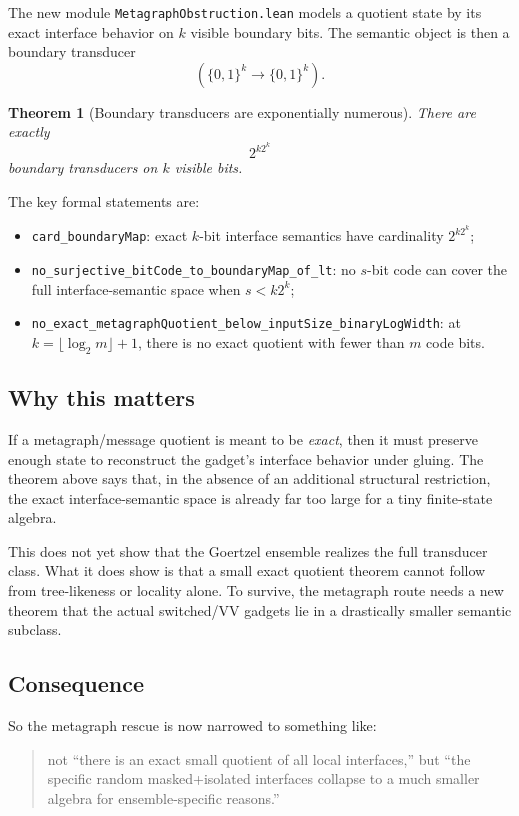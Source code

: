 \documentclass[11pt]{article}
\newtheorem{theorem}{Theorem}[section]
\theoremstyle{remark}
\begin{document}
The new module \texttt{MetagraphObstruction.lean} models a quotient state by its exact interface
behavior on \(k\) visible boundary bits.  The semantic object is then a boundary transducer
\[
  (\{0,1\}^k \to \{0,1\}^k).
\]

\begin{theorem}[Boundary transducers are exponentially numerous]
There are exactly
\[
  2^{k 2^k}
\]
boundary transducers on \(k\) visible bits.
\end{theorem}

\noindent
The key formal statements are:
\begin{itemize}[leftmargin=1.5em]
  \item \texttt{card\_boundaryMap}: exact \(k\)-bit interface semantics have cardinality
  \(2^{k2^k}\);
  \item \texttt{no\_surjective\_bitCode\_to\_boundaryMap\_of\_lt}: no \(s\)-bit code can cover the
  full interface-semantic space when \(s < k2^k\);
  \item \texttt{no\_exact\_metagraphQuotient\_below\_inputSize\_binaryLogWidth}: at
  \(k = \lfloor \log_2 m \rfloor + 1\), there is no exact quotient with fewer than \(m\) code bits.
\end{itemize}

\subsection{Why this matters}

If a metagraph/message quotient is meant to be \emph{exact}, then it must preserve enough state to
reconstruct the gadget's interface behavior under gluing.  The theorem above says that, in the
absence of an additional structural restriction, the exact interface-semantic space is already far
too large for a tiny finite-state algebra.

This does not yet show that the Goertzel ensemble realizes the full transducer class.  What it
does show is that a small exact quotient theorem cannot follow from tree-likeness or locality
alone.  To survive, the metagraph route needs a new theorem that the actual switched/VV gadgets
lie in a drastically smaller semantic subclass.

\subsection{Consequence}

So the metagraph rescue is now narrowed to something like:
\begin{quote}
not ``there is an exact small quotient of all local interfaces,''
but ``the specific random masked+isolated interfaces collapse to a much smaller algebra for
ensemble-specific reasons.''
\end{quote}
\end{document}
